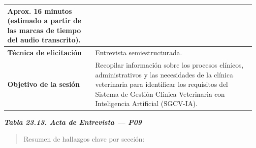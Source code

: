 \documentclass[
]{article}
\begin{document}
{\begin{longtable}[]{|
  >{\raggedright\arraybackslash}p{}|
  >{\raggedright\arraybackslash}p{}|}
\begin{minipage}[t]{\linewidth}
Aprox. 16 minutos (estimado a partir de las marcas de tiempo del audio transcrito).
\end{minipage} \\
\hline
\textbf{Técnica de elicitación} & \begin{minipage}[t]{\linewidth}\raggedright
Entrevista semiestructurada.
\end{minipage} \\
\hline
\textbf{Objetivo de la sesión} & \begin{minipage}[t]{\linewidth}\raggedright
Recopilar información sobre los procesos clínicos, administrativos y las necesidades de la clínica veterinaria para identificar los requisitos del Sistema de Gestión Clínica Veterinaria con Inteligencia Artificial (SGCV-IA).
\end{minipage} \\
\hline
\end{longtable}
}

\protect{}\label{_bookmark_P09_acta}{}\emph{\textbf{Tabla 23.13. Acta de Entrevista --- P09}}

\begin{quote}
Resumen de hallazgos clave por sección:
\end{quote}
\end{document}

